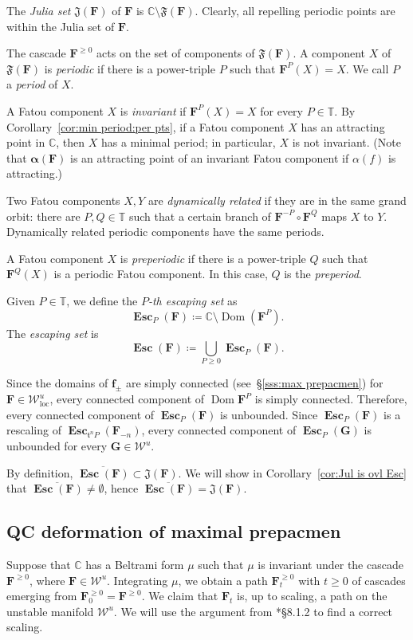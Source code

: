 \documentclass{amsart}
\newcommand{\Dom}{\operatorname {Dom}}
\newcommand{\1}{{\mathbb 1 }}
\newcommand\PT{\mathbb{ T}}
\newcommand\Jul{{\mathfrak J}}
\newcommand{\bF}{{\mathbf F}}
\newcommand{\bG}{{\mathbf G}}
\newcommand{\bbf}{{\mathbf f}}
\renewcommand{\tt}{\mathfrak{t}}
\def\loc{{\mathrm{loc}}}
\newcommand\Unst{{\boldsymbol{\mathcal{W}}^u}}
\newcommand\UnstLoc{{\boldsymbol{\mathcal{W}}^u_\loc}}
\newcommand{\C}{\mathbb{C}}
\theoremstyle{remark}
\numberwithin{equation}{section}
\theoremstyle{definition}
\newcommand{\Fat}{{\mathfrak F}}
\newcommand{\Esc}{{\boldsymbol{\operatorname{Esc}}}}
\newcommand{\balpha}{{\boldsymbol \alpha}}
\theoremstyle{nonumberbreak}
\begin{document}
The \emph{Julia set}  $\Jul(\bF)$ of $\bF$ is $\C\setminus \Fat(\bF)$. 
 Clearly, all repelling periodic points are within the Julia set of $\bF$. 

The cascade $\bF^{\ge 0}$ acts on the set of components of $\Fat(\bF)$.  A component $X$ of $\Fat(\bF)$ is \emph{periodic} if there is a power-triple $P$ such that $\bF^P(X)= X$. We call $P$ a \emph{period} of $X$. 

A Fatou component $X$ is \emph{invariant} if $\bF^P(X)= X$ for every $P\in \PT$. By Corollary~\ref{cor:min period:per pts}, if a Fatou component $X$ has an attracting point in $\C$, then $X$ has a minimal period; in particular, $X$ is not invariant. (Note that $\balpha(\bF)$ is an attracting point of an invariant Fatou component if $\alpha(f)$ is attracting.)

Two Fatou components $X,Y$ are \emph{dynamically related} if they are in the same grand orbit: there are $P,Q\in \PT$ such that a certain branch of $\bF^{-P}\circ \bF^Q$ maps $X$ to $Y$. Dynamically related periodic components have the same periods.

A Fatou component $X$ is \emph{preperiodic} if there is a power-triple $Q$ such that $\bF^Q(X)$ is a periodic Fatou component. In this case, $Q$ is the \emph{preperiod}. 



 Given $P\in \PT$, we define the \emph{$P$-th escaping set} as 
\[\Esc_P (\bF) \coloneqq \C\setminus \Dom(\bF^P).\]
The \emph{escaping set} is
\[\Esc(\bF)\coloneqq \bigcup_{P\ge0} \Esc_P(\bF).\] 


Since the domains of $\bbf_\pm$ are simply connected (see~\S\ref{sss:max prepacmen}) for $\bF\in \UnstLoc$, every connected component of $\Dom \bF^P$ is simply connected. Therefore, every connected component of $\Esc_P(\bF)$ is unbounded. Since $\Esc_P(\bF)$ is a rescaling of $\Esc_{\tt ^nP} (\bF_{-n})$, every connected component of $\Esc_P(\bG)$ is unbounded for every $\bG\in \Unst$.


By definition, $\overline {\Esc(\bF) }\subset \Jul(\bF)$. We will show in Corollary~\ref{cor:Jul is ovl Esc} that $\overline {\Esc(\bF) }\not=\emptyset$, hence $\overline {\Esc(\bF) }= \Jul(\bF)$. 






\subsection{QC deformation of maximal prepacmen}
\label{ss:QC deform}
Suppose that $\C$ has a Beltrami form $\mu$ such that $\mu$ is invariant under the cascade $\bF^{\ge 0}$, where $\bF\in \Unst$. Integrating $\mu$, we obtain a path $\bF_t^{\ge 0}$ with $t\ge 0$ of cascades emerging from $\bF^{\ge0}_0=\bF^{\ge0}$. We claim that $\bF_t$ is, up to scaling, a path on the unstable manifold $\Unst$. We will use the argument from \cite{DLS}*{\S 8.1.2} to find a correct scaling. 
\end{document}

